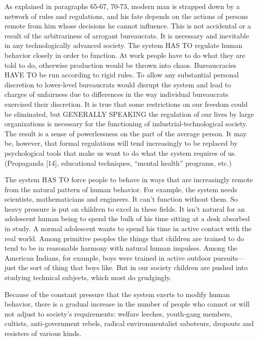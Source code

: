  As explained in paragraphs 65-67, 70-73, modern man is strapped down by a network of rules and regulations, and his fate depends on the actions of persons remote from him whose decisions he cannot influence. This is not accidental or a result of the arbitrariness of arrogant bureaucrats. It is necessary and inevitable in any technologically advanced society. The system HAS TO regulate human behavior closely in order to function. At work people have to do what they are told to do, otherwise production would be thrown into chaos. Bureaucracies HAVE TO be run according to rigid rules. To allow any substantial personal discretion to lower-level bureaucrats would disrupt the system and lead to charges of unfairness due to differences in the way individual bureaucrats exercised their discretion. It is true that some restrictions on our freedom could be eliminated, but GENERALLY SPEAKING the regulation of our lives by large organizations is necessary for the functioning of industrial-technological society. The result is a sense of powerlessness on the part of the average person. It may be, however, that formal regulations will tend increasingly to be replaced by psychological tools that make us want to do what the system requires of us. (Propaganda [14], educational techniques, “mental health” programs, etc.)

 The system HAS TO force people to behave in ways that are increasingly remote from the natural pattern of human behavior. For example, the system needs scientists, mathematicians and engineers. It can’t function without them. So heavy pressure is put on children to excel in these fields. It isn’t natural for an adolescent human being to spend the bulk of his time sitting at a desk absorbed in study. A normal adolescent wants to spend his time in active contact with the real world. Among primitive peoples the things that children are trained to do tend to be in reasonable harmony with natural human impulses. Among the American Indians, for example, boys were trained in active outdoor pursuits—
just the sort of thing that boys like. But in our society children are pushed into studying technical subjects, which most do grudgingly.

 Because of the constant pressure that the system exerts to modify human behavior, there is a gradual increase in the number of people who cannot or will not adjust to society’s requirements: welfare leeches, youth-gang members, cultists, anti-government rebels, radical environmentalist saboteurs, dropouts and resisters of various kinds.

